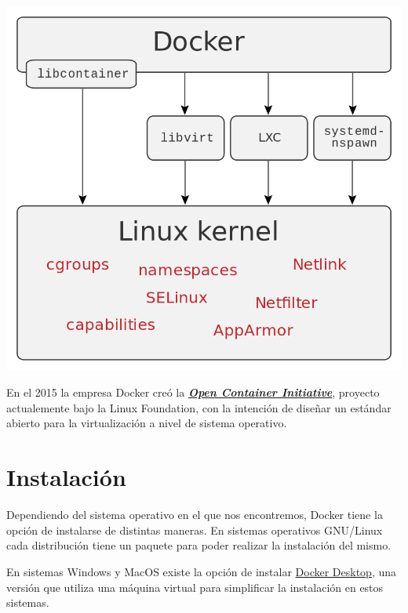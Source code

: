 \begin{center}
    \includegraphics[width=0.75\linewidth]{img/docker/docker_interfaces.png}
\end{center}

En el 2015 la empresa Docker creó la \textbf{\textit{\href{https://en.wikipedia.org/wiki/Open_Container_Initiative}{Open Container Initiative}}}, proyecto actualemente bajo la Linux Foundation, con la intención de diseñar un estándar abierto para la virtualización a nivel de sistema operativo.

\section{Instalación}

Dependiendo del sistema operativo en el que nos encontremos, Docker tiene la opción de instalarse de distintas maneras. En sistemas operativos GNU/Linux cada distribución tiene un paquete para poder realizar la instalación del mismo.



En sistemas Windows y MacOS existe la opción de instalar \href{https://docs.docker.com/get-docker/}{Docker Desktop}, una versión que utiliza una máquina virtual para simplificar la instalación en estos sistemas.

